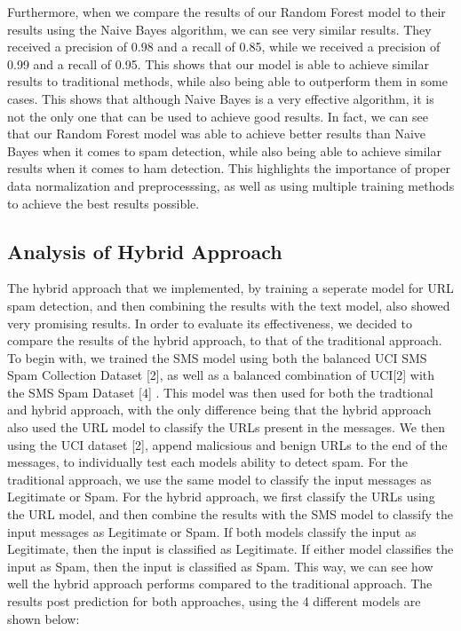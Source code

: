 \documentclass{article}
\begin{document}
\newline
\noindent
Furthermore, when we compare the results of our Random Forest model to their results using the Naive Bayes algorithm, we can see very similar results. They received a precision of 0.98 and a recall of 0.85, while we received a precision of 0.99 and a recall of 0.95. This shows that our model is able to achieve similar results to traditional methods, while also being able to outperform them in some cases. This shows that although Naive Bayes is a very effective algorithm, it is not the only one that can be used to achieve good results. In fact, we can see that our Random Forest model was able to achieve better results than Naive Bayes when it comes to spam detection, while also being able to achieve similar results when it comes to ham detection. This highlights the importance of proper data normalization and preprocesssing, as well as using multiple training methods to achieve the best results possible.

\subsection{Analysis of Hybrid Approach}

\noindent
The hybrid approach that we implemented, by training a seperate model for URL spam detection, and then combining the results with the text model, also showed very promising results. In order to evaluate its effectiveness, we decided to compare the results of the hybrid approach, to that of the traditional approach. To begin with, we trained the SMS model using both the balanced UCI SMS Spam Collection Dataset [2], as well as a balanced combination of UCI[2] with the SMS Spam Dataset [4] . This model was then used for both the tradtional and hybrid approach, with the only difference being that the hybrid approach also used the URL model to classify the URLs present in the messages. We then using the UCI dataset [2], append malicsious and benign URLs to the end of the messages, to individually test each models ability to detect spam. For the traditional approach, we use the same model to classify the input messages as Legitimate or Spam. For the hybrid approach, we first classify the URLs using the URL model, and then combine the results with the SMS model to classify the input messages as Legitimate or Spam. If both models classify the input as Legitimate, then the input is classified as Legitimate. If either model classifies the input as Spam, then the input is classified as Spam. This way, we can see how well the hybrid approach performs compared to the traditional approach. The results post prediction for both approaches, using the 4 different models are shown below:
\end{document}
